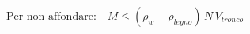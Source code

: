 \documentclass[preview]{standalone}
\begin{document}
\begin{align*}
\text{Per non affondare:} \quad M \le (\rho_w-\rho_{legno})\, N\, V_{tronco}
\end{align*}
\end{document}
